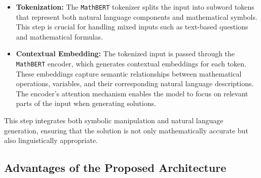 \documentclass{article}
\begin{document}
\begin{itemize}
    \item \textbf{Tokenization:} The \texttt{MathBERT} tokenizer splits the input into subword tokens that represent both natural language components and mathematical symbols. This step is crucial for handling mixed inputs such as text-based questions and mathematical formulas.
    \item \textbf{Contextual Embedding:} The tokenized input is passed through the \texttt{MathBERT} encoder, which generates contextual embeddings for each token. These embeddings capture semantic relationships between mathematical operations, variables, and their corresponding natural language descriptions. The encoder's attention mechanism enables the model to focus on relevant parts of the input when generating solutions.
\end{itemize}




This step integrates both symbolic manipulation and natural language generation, ensuring that the solution is not only mathematically accurate but also linguistically appropriate.

\subsection{Advantages of the Proposed Architecture}
\end{document}
